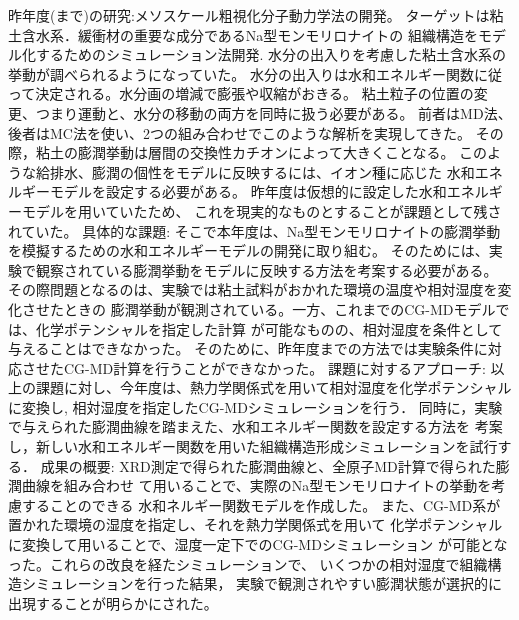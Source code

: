     昨年度(まで)の研究:メソスケール粗視化分子動力学法の開発。 ターゲットは粘土含水系．緩衝材の重要な成分であるNa型モンモリロナイトの 組織構造をモデル化するためのシミュレーション法開発. 水分の出入りを考慮した粘土含水系の挙動が調べられるようになっていた。 水分の出入りは水和エネルギー関数に従って決定される。水分画の増減で膨張や収縮がおきる。 粘土粒子の位置の変更、つまり運動と、水分の移動の両方を同時に扱う必要がある。 前者はMD法、後者はMC法を使い、2つの組み合わせでこのような解析を実現してきた。 その際，粘土の膨潤挙動は層間の交換性カチオンによって大きくことなる。 このような給排水、膨潤の個性をモデルに反映するには、イオン種に応じた 水和エネルギーモデルを設定する必要がある。 昨年度は仮想的に設定した水和エネルギーモデルを用いていたため、 これを現実的なものとすることが課題として残されていた。
    具体的な課題: そこで本年度は、Na型モンモリロナイトの膨潤挙動を模擬するための水和エネルギーモデルの開発に取り組む。 そのためには、実験で観察されている膨潤挙動をモデルに反映する方法を考案する必要がある。 その際問題となるのは、実験では粘土試料がおかれた環境の温度や相対湿度を変化させたときの 膨潤挙動が観測されている。一方、これまでのCG-MDモデルでは、化学ポテンシャルを指定した計算 が可能なものの、相対湿度を条件として与えることはできなかった。 そのために、昨年度までの方法では実験条件に対応させたCG-MD計算を行うことができなかった。
    課題に対するアプローチ: 以上の課題に対し、今年度は、熱力学関係式を用いて相対湿度を化学ポテンシャルに変換し, 相対湿度を指定したCG-MDシミュレーションを行う． 同時に，実験で与えられた膨潤曲線を踏まえた、水和エネルギー関数を設定する方法を 考案し，新しい水和エネルギー関数を用いた組織構造形成シミュレーションを試行する．
    成果の概要: XRD測定で得られた膨潤曲線と、全原子MD計算で得られた膨潤曲線を組み合わせ て用いることで、実際のNa型モンモリロナイトの挙動を考慮することのできる 水和ネルギー関数モデルを作成した。 また、CG-MD系が置かれた環境の湿度を指定し、それを熱力学関係式を用いて 化学ポテンシャルに変換して用いることで、湿度一定下でのCG-MDシミュレーション が可能となった。これらの改良を経たシミュレーションで、 いくつかの相対湿度で組織構造シミュレーションを行った結果， 実験で観測されやすい膨潤状態が選択的に出現することが明らかにされた。
